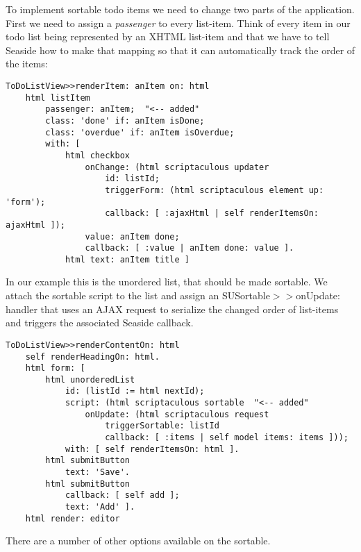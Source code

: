 \documentclass[a4paper,10pt,twoside]{book}
\newcommand{\ct}[1]{{\small\ttfamily\textup{#1}}}
\begin{document}
To implement sortable todo items we need to change two parts of the application. First we need to assign a \textit{passenger} to every list-item. Think of every item in our todo list being represented by an XHTML list-item and that we have to tell Seaside how to make that mapping so that it can automatically track the order of the items:

\begin{lstlisting}
ToDoListView>>renderItem: anItem on: html
    html listItem
        passenger: anItem;  "<-- added"
        class: 'done' if: anItem isDone;
        class: 'overdue' if: anItem isOverdue;
        with: [
            html checkbox
                onChange: (html scriptaculous updater
                    id: listId;
                    triggerForm: (html scriptaculous element up: 'form');
                    callback: [ :ajaxHtml | self renderItemsOn: ajaxHtml ]);
                value: anItem done;
                callback: [ :value | anItem done: value ].
            html text: anItem title ]
\end{lstlisting}

In our example this is the unordered list, that should be made sortable. We attach the sortable script to the list and assign an  \ct{SUSortable$>$$>$onUpdate:} handler that uses an AJAX request to serialize the changed order of list-items and triggers the associated Seaside callback.

\begin{lstlisting}
ToDoListView>>renderContentOn: html
    self renderHeadingOn: html.
    html form: [
        html unorderedList
            id: (listId := html nextId);
            script: (html scriptaculous sortable  "<-- added" 
                onUpdate: (html scriptaculous request
                    triggerSortable: listId
                    callback: [ :items | self model items: items ]));
            with: [ self renderItemsOn: html ].
        html submitButton
            text: 'Save'.
        html submitButton
            callback: [ self add ];
            text: 'Add' ].
    html render: editor
\end{lstlisting}

There are a number of other options available on the sortable.
\end{document}
